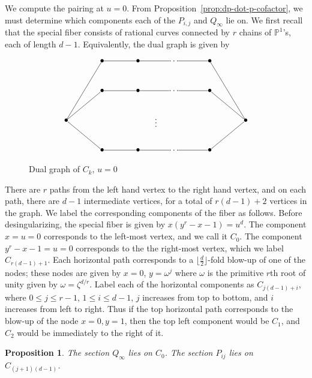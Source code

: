 \documentclass[reqno]{amsart}
\newtheorem{proposition}[thm]{Proposition}
\theoremstyle{definition}
\theoremstyle{remark}
\def\Pro{\ensuremath{\mathbb{P}}}
\begin{document}
We compute the pairing at $u = 0$. From Proposition~\ref{prop:dp-dot-p-cofactor}, we must determine which components each of the $P_{i,j}$ and $Q_\infty$ lie on. We first recall that the special fiber consists of rational curves connected by $r$ chains of $\Pro^1$'s, each of length $d-1$. Equivalently, the dual graph is given by
\begin{figure}[h]\centering
  \[
\xygraph{
  !{<0cm,0cm>;<1.5cm,0cm>:<0cm,1.25cm>::}
  !{(0, 2) }*{\bullet}="c0"
  !{(5, 2) }*{\bullet}="clast"
  !{(1, 4) }*{\bullet}="c11"
  !{(2, 4) }*{\bullet}="c12"
  !{(3, 4) }*{\dots}="c1dots"
  !{(4, 4) }*{\bullet}="c1last"
  !{(1, 3) }*{\bullet}="c21"
  !{(2, 3) }*{\bullet}="c22"
  !{(3, 3) }*{\dots}="c2dots"
  !{(4, 3) }*{\bullet}="c2last"
  !{(2.5, 2) }*{\vdots}
  !{(1, 1) }*{\bullet}="cr1"
  !{(2, 1) }*{\bullet}="cr2"
  !{(3, 1) }*{\dots}="crdots"
  !{(4, 1) }*{\bullet}="crlast"
  "c0"-"c11"
  "c11"-"c12"
  "c12"-"c1dots"
  "c1dots"-"c1last"
  "c1last"-"clast"
  "c0"-"c21"
  "c21"-"c22"
  "c22"-"c2dots"
  "c2dots"-"c2last"
  "c2last"-"clast"
  "c0"-"cr1"
  "cr1"-"cr2"
  "cr2"-"crdots"
  "crdots"-"crlast"
  "crlast"-"clast"
}
\]
  \caption{Dual graph of $C_k$, $u=0$}
\label{fig:u-equals-zero}
\end{figure}
There are $r$ paths from the left hand vertex to the right hand vertex, and on each path, there are $d-1$ intermediate vertices, for a total of $r(d-1) + 2$ vertices in the graph. We label the corresponding components of the fiber as follows. Before desingularizing, the special fiber is given by $x(y^r - x - 1) = u^d$. The component $x = u = 0$ corresponds to the left-most vertex, and we call it $C_0$. The component $y^r - x - 1 = u = 0$ corresponds to the the right-most vertex, which we label $C_{r(d-1)+1}$. Each horizontal path corresponds to a $\lfloor \frac{d}{2}\rfloor$-fold blow-up of one of the nodes; these nodes are given by $x = 0$, $y = \omega^j$ where $\omega$ is the primitive $r$th root of unity given by $\omega = \zeta^{d/r}$. Label each of the horizontal components as $C_{j(d-1) + i}$, where $0 \leq j \leq r-1$, $1 \leq i \leq d-1$, $j$ increases from top to bottom, and $i$ increases from left to right. Thus if the top horizontal path corresponds to the blow-up of the node $x = 0, y = 1$, then the top left component would be $C_1$, and $C_2$ would be immediately to the right of it.

\begin{proposition}
  The section $Q_\infty$ lies on $C_0$. The section $P_{ij}$ lies on $C_{(j+1)(d-1)}$.
\end{proposition}
\end{document}
